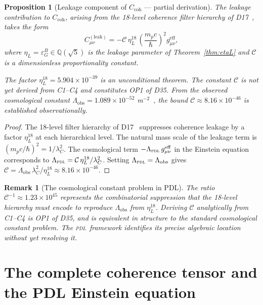 \documentclass[12pt,a4paper]{article}
\newtheorem{proposition}[theorem]{Proposition}
\newtheorem{remark}[theorem]{Remark}
\newcommand{\hb}{\hbar}
\newcommand{\PDL}{\textsc{pdl}}
\newcommand{\Ccoh}{C_{\mathrm{coh}}}
\newcommand{\Cleak}{C^{(\mathrm{leak})}}
\newcommand{\geff}{g_{\mu\nu}^{\mathrm{eff}}}
\newcommand{\lambdaC}{\lambda_C}
\newcommand{\etaL}{\eta_L}
\begin{document}
\begin{proposition}[Leakage component of $\Ccoh$ --- partial derivation]
\label{prop:Cleak}
The leakage contribution to $\Ccoh$, arising from the 18-level coherence filter hierarchy of D17~\cite{PDL_D17_2026}, takes the form
\begin{equation}
\Cleak_{\mu\nu} = -\mathcal{C}\,\etaL^{18}\,\left(\frac{m_p c}{\hb}\right)^2\geff,
\label{eq:Cleak}
\end{equation}
where $\etaL = \varepsilon_G^B \in \mathbb{Q}(\sqrt{5})$ is the leakage parameter of Theorem~\ref{thm:etaL} and $\mathcal{C}$ is a dimensionless proportionality constant.

The factor $\etaL^{18} = 5.904\times10^{-39}$ is an unconditional theorem. The constant $\mathcal{C}$ is not yet derived from C1--C4 and constitutes OP1 of D35. From the observed cosmological constant $\Lambda_{\mathrm{obs}} = 1.089\times10^{-52}$ m$^{-2}$~\cite{Planck_2020}, the bound $\mathcal{C} \approx 8.16\times10^{-46}$ is established observationally.
\end{proposition}

\begin{proof}
The 18-level filter hierarchy of D17~\cite{PDL_D17_2026} suppresses coherence leakage by a factor $\etaL^{18}$ at each hierarchical level. The natural mass scale of the leakage term is $(m_p c/\hb)^2 = 1/\lambdaC^2$. The cosmological term $-\Lambda_{\PDL}\,\geff$ in the Einstein equation corresponds to $\Lambda_{\PDL} = \mathcal{C}\,\etaL^{18}/\lambdaC^2$. Setting $\Lambda_{\PDL} = \Lambda_{\mathrm{obs}}$ gives $\mathcal{C} = \Lambda_{\mathrm{obs}}\,\lambdaC^2/\etaL^{18} \approx 8.16\times10^{-46}$.
\end{proof}

\begin{remark}[The cosmological constant problem in PDL]
The ratio $\mathcal{C}^{-1} \approx 1.23\times10^{45}$ represents the combinatorial suppression that the 18-level hierarchy must encode to reproduce $\Lambda_{\mathrm{obs}}$ from $\etaL^{18}$. Deriving $\mathcal{C}$ analytically from C1--C4 is OP1 of D35, and is equivalent in structure to the standard cosmological constant problem. The \PDL\ framework identifies its precise algebraic location without yet resolving it.
\end{remark}

\section{The complete coherence tensor and the PDL Einstein equation}
\label{sec:full}
\end{document}
